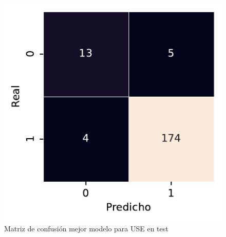 \begin{figure}[htbp]
    \vspace{1.5em} %

    \includegraphics[width=0.75\linewidth]{figures/5_experiments/multi-use-cm.pdf}
    \caption{Matriz de confusión mejor modelo para USE en test}
    \label{fig5:USE_confusion_matrix}
\end{figure}

